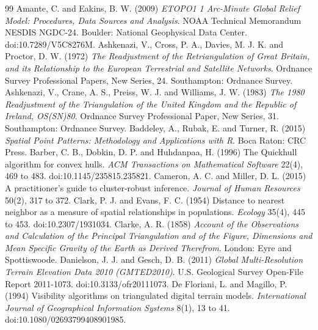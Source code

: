 \documentclass[11pt,a4paper]{article}
\begin{document}
\begin{thebibliography}{99}
 Amante, C. and Eakins, B. W. (2009) \textit{ETOPO1 1 Arc-Minute Global Relief Model: Procedures, Data Sources and Analysis}. NOAA Technical Memorandum NESDIS NGDC-24. Boulder: National Geophysical Data Center. doi:10.7289/V5C8276M.
 Ashkenazi, V., Cross, P. A., Davies, M. J. K. and Proctor, D. W. (1972) \textit{The Readjustment of the Retriangulation of Great Britain, and its Relationship to the European Terrestrial and Satellite Networks}. Ordnance Survey Professional Papers, New Series, 24. Southampton: Ordnance Survey.
 Ashkenazi, V., Crane, A. S., Preiss, W. J. and Williams, J. W. (1983) \textit{The 1980 Readjustment of the Triangulation of the United Kingdom and the Republic of Ireland, OS(SN)80}. Ordnance Survey Professional Paper, New Series, 31. Southampton: Ordnance Survey.
 Baddeley, A., Rubak, E. and Turner, R. (2015) \textit{Spatial Point Patterns: Methodology and Applications with R}. Boca Raton: CRC Press.
 Barber, C. B., Dobkin, D. P. and Huhdanpaa, H. (1996) The Quickhull algorithm for convex hulls. \textit{ACM Transactions on Mathematical Software} 22(4), 469 to 483. doi:10.1145/235815.235821.
 Cameron, A. C. and Miller, D. L. (2015) A practitioner's guide to cluster-robust inference. \textit{Journal of Human Resources} 50(2), 317 to 372.
 Clark, P. J. and Evans, F. C. (1954) Distance to nearest neighbor as a measure of spatial relationships in populations. \textit{Ecology} 35(4), 445 to 453. doi:10.2307/1931034.
 Clarke, A. R. (1858) \textit{Account of the Observations and Calculation of the Principal Triangulation and of the Figure, Dimensions and Mean Specific Gravity of the Earth as Derived Therefrom}. London: Eyre and Spottiswoode.
 Danielson, J. J. and Gesch, D. B. (2011) \textit{Global Multi-Resolution Terrain Elevation Data 2010 (GMTED2010)}. U.S. Geological Survey Open-File Report 2011-1073. doi:10.3133/ofr20111073.
 De Floriani, L. and Magillo, P. (1994) Visibility algorithms on triangulated digital terrain models. \textit{International Journal of Geographical Information Systems} 8(1), 13 to 41. doi:10.1080/02693799408901985.

\end{thebibliography}
\end{document}
